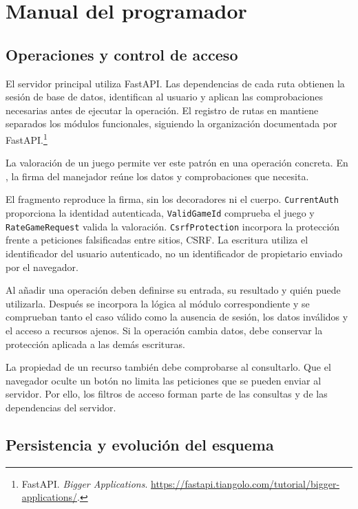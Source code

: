 \FloatBarrier
\section{Manual del programador}
\label{sec:d-programador}

\subsection{Operaciones y control de acceso}

El servidor principal utiliza FastAPI. Las dependencias de cada ruta obtienen la sesión de base de datos, identifican al usuario y aplican las comprobaciones necesarias antes de ejecutar la operación. El registro de rutas en  mantiene separados los módulos funcionales, siguiendo la organización documentada por FastAPI.\footnote{FastAPI. \emph{Bigger Applications}. \url{https://fastapi.tiangolo.com/tutorial/bigger-applications/}.}

La valoración de un juego permite ver este patrón en una operación concreta. En , la firma del manejador reúne los datos y comprobaciones que necesita.


El fragmento reproduce la firma, sin los decoradores ni el cuerpo. \texttt{CurrentAuth} proporciona la identidad autenticada, \texttt{ValidGameId} comprueba el juego y \texttt{RateGameRequest} valida la valoración. \texttt{CsrfProtection} incorpora la protección frente a peticiones falsificadas entre sitios, \acs{CSRF}. La escritura utiliza el identificador del usuario autenticado, no un identificador de propietario enviado por el navegador.

Al añadir una operación deben definirse su entrada, su resultado y quién puede utilizarla. Después se incorpora la lógica al módulo correspondiente y se comprueban tanto el caso válido como la ausencia de sesión, los datos inválidos y el acceso a recursos ajenos. Si la operación cambia datos, debe conservar la protección aplicada a las demás escrituras.

La propiedad de un recurso también debe comprobarse al consultarlo. Que el navegador oculte un botón no limita las peticiones que se pueden enviar al servidor. Por ello, los filtros de acceso forman parte de las consultas y de las dependencias del servidor.

\subsection{Persistencia y evolución del esquema}

